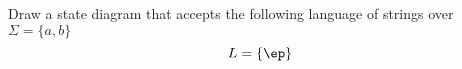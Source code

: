 Draw a state diagram that accepts the following
language of strings over $\Sigma =
\{ a, b \}$ 
\[
L = \{\ep\}
\]
